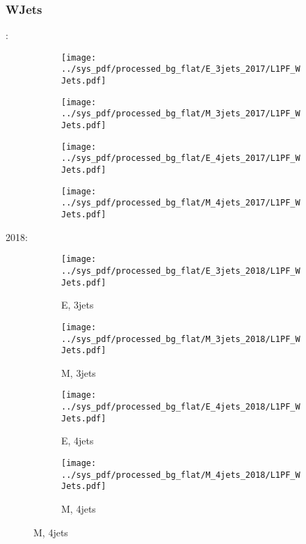 \documentclass{beamer}
\begin{document}
\begin{frame}
\frametitle{WJets}
\fontsize{5}{1}:
\begin{figure}
\centering
\begin{subfigure}[b]{0.24\textwidth}
\texttt{[image: ../sys\_pdf/processed\_bg\_flat/E\_3jets\_2017/L1PF\_WJets.pdf]}
\end{subfigure}
\begin{subfigure}[b]{0.24\textwidth}
\texttt{[image: ../sys\_pdf/processed\_bg\_flat/M\_3jets\_2017/L1PF\_WJets.pdf]}
\end{subfigure}
\begin{subfigure}[b]{0.24\textwidth}
\texttt{[image: ../sys\_pdf/processed\_bg\_flat/E\_4jets\_2017/L1PF\_WJets.pdf]}
\end{subfigure}
\begin{subfigure}[b]{0.24\textwidth}
\texttt{[image: ../sys\_pdf/processed\_bg\_flat/M\_4jets\_2017/L1PF\_WJets.pdf]}
\end{subfigure}
\end{figure}
2018:
\begin{figure}
\centering
\begin{subfigure}[b]{0.24\textwidth}
\texttt{[image: ../sys\_pdf/processed\_bg\_flat/E\_3jets\_2018/L1PF\_WJets.pdf]}
\captionsetup{font=tiny}
\caption{E, 3jets}
\end{subfigure}
\begin{subfigure}[b]{0.24\textwidth}
\texttt{[image: ../sys\_pdf/processed\_bg\_flat/M\_3jets\_2018/L1PF\_WJets.pdf]}
\captionsetup{font=tiny}
\caption{M, 3jets}
\end{subfigure}
\begin{subfigure}[b]{0.24\textwidth}
\texttt{[image: ../sys\_pdf/processed\_bg\_flat/E\_4jets\_2018/L1PF\_WJets.pdf]}
\captionsetup{font=tiny}
\caption{E, 4jets}
\end{subfigure}
\begin{subfigure}[b]{0.24\textwidth}
\texttt{[image: ../sys\_pdf/processed\_bg\_flat/M\_4jets\_2018/L1PF\_WJets.pdf]}
\captionsetup{font=tiny}
\caption{M, 4jets}
\end{subfigure}
\end{figure}
\end{frame}
\end{document}

